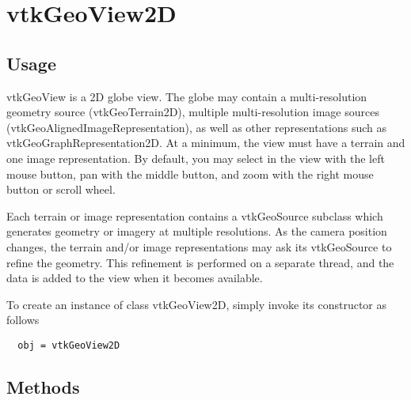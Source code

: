 \section{vtkGeoView2D}

\subsection{Usage}

 vtkGeoView is a 2D globe view. The globe may contain a multi-resolution
 geometry source (vtkGeoTerrain2D), multiple multi-resolution image sources
 (vtkGeoAlignedImageRepresentation), as well as other representations such
 as vtkGeoGraphRepresentation2D. At a minimum, the view must have a terrain
 and one image representation. By default, you may select in the view with
 the left mouse button, pan with the middle button, and zoom with the right
 mouse button or scroll wheel.

 Each terrain or image representation contains a vtkGeoSource subclass which
 generates geometry or imagery at multiple resolutions. As the camera 
 position changes, the terrain and/or image representations may ask its
 vtkGeoSource to refine the geometry. This refinement is performed on a
 separate thread, and the data is added to the view when it becomes available.


To create an instance of class vtkGeoView2D, simply
invoke its constructor as follows
\begin{verbatim}
  obj = vtkGeoView2D
\end{verbatim}
\subsection{Methods}


